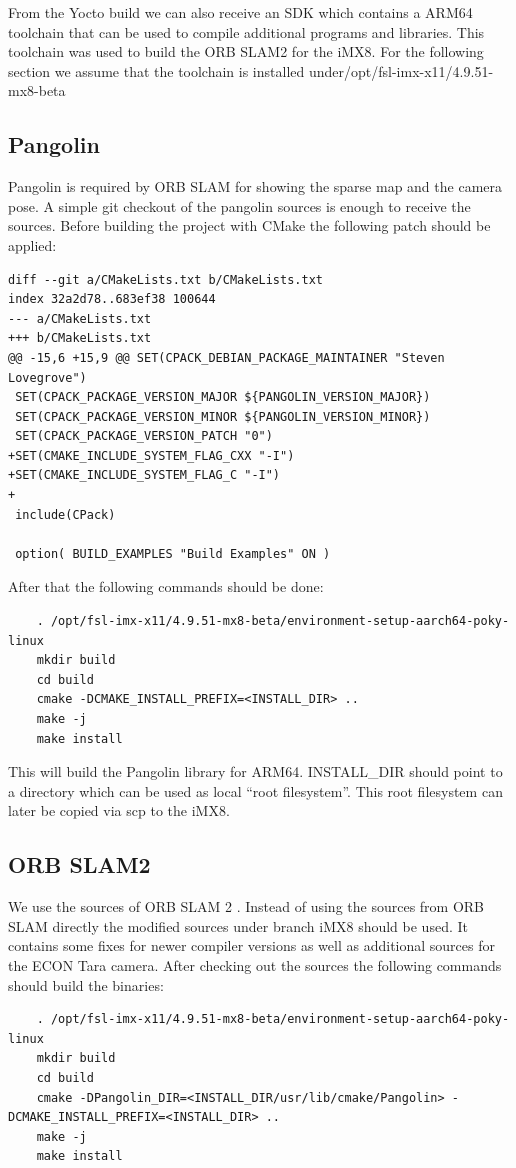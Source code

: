 \documentclass[11pt,a4paper,titlepage,oneside]{report}
\begin{document}
From the Yocto build we can also receive an SDK which contains a ARM64 toolchain that can be used to compile additional programs and libraries. This toolchain was used to build the ORB SLAM2 for the iMX8. For the following section we assume that the toolchain is installed under/opt/fsl-imx-x11/4.9.51-mx8-beta

\subsection{Pangolin}
Pangolin \cite{pangolin} is required by ORB SLAM for showing the sparse map and the camera pose. A simple git checkout of the pangolin sources is enough to receive the sources. Before building the project with CMake the following patch should be applied:
\begin{lstlisting}
diff --git a/CMakeLists.txt b/CMakeLists.txt
index 32a2d78..683ef38 100644
--- a/CMakeLists.txt
+++ b/CMakeLists.txt
@@ -15,6 +15,9 @@ SET(CPACK_DEBIAN_PACKAGE_MAINTAINER "Steven Lovegrove")
 SET(CPACK_PACKAGE_VERSION_MAJOR ${PANGOLIN_VERSION_MAJOR})
 SET(CPACK_PACKAGE_VERSION_MINOR ${PANGOLIN_VERSION_MINOR})
 SET(CPACK_PACKAGE_VERSION_PATCH "0")
+SET(CMAKE_INCLUDE_SYSTEM_FLAG_CXX "-I")
+SET(CMAKE_INCLUDE_SYSTEM_FLAG_C "-I")
+
 include(CPack)
 
 option( BUILD_EXAMPLES "Build Examples" ON )
\end{lstlisting}

After that the following commands should be done:
\begin{lstlisting}
	. /opt/fsl-imx-x11/4.9.51-mx8-beta/environment-setup-aarch64-poky-linux
	mkdir build
	cd build
	cmake -DCMAKE_INSTALL_PREFIX=<INSTALL_DIR> ..
	make -j
	make install
\end{lstlisting}

This will build the Pangolin library for ARM64. INSTALL\_DIR should point to a directory which can be used as local ``root filesystem''. This root filesystem can later be copied via scp to the iMX8.

\subsection{ORB SLAM2}
We use the sources of ORB SLAM 2 \cite{orbslam2_impl}. Instead of using the sources from ORB SLAM directly the modified sources \cite{orbslam2_se} under branch iMX8 should be used. It contains some fixes for newer compiler versions as well as additional sources for the ECON Tara camera. After checking out the sources the following commands should build the binaries:\\
\begin{lstlisting}
	. /opt/fsl-imx-x11/4.9.51-mx8-beta/environment-setup-aarch64-poky-linux
	mkdir build
	cd build
	cmake -DPangolin_DIR=<INSTALL_DIR/usr/lib/cmake/Pangolin> -DCMAKE_INSTALL_PREFIX=<INSTALL_DIR> ..
	make -j
	make install
\end{lstlisting}
\end{document}
